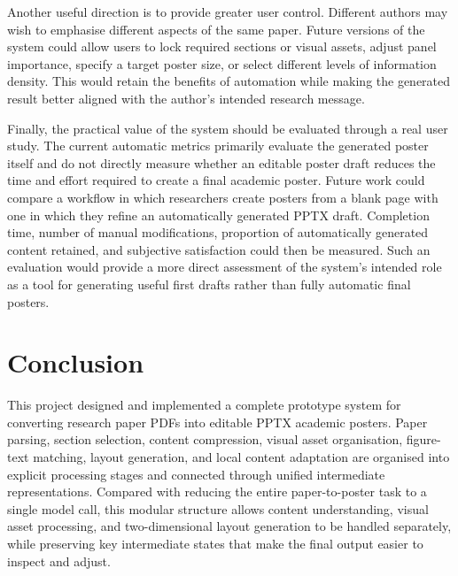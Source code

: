 \documentclass[12pt,oneside]{report}
\begin{document}
\vspace{1em}

Another useful direction is to provide greater user control. Different authors may wish to emphasise different aspects of the same paper. Future versions of the system could allow users to lock required sections or visual assets, adjust panel importance, specify a target poster size, or select different levels of information density. This would retain the benefits of automation while making the generated result better aligned with the author's intended research message.

\vspace{1em}

Finally, the practical value of the system should be evaluated through a real user study. The current automatic metrics primarily evaluate the generated poster itself and do not directly measure whether an editable poster draft reduces the time and effort required to create a final academic poster. Future work could compare a workflow in which researchers create posters from a blank page with one in which they refine an automatically generated PPTX draft. Completion time, number of manual modifications, proportion of automatically generated content retained, and subjective satisfaction could then be measured. Such an evaluation would provide a more direct assessment of the system's intended role as a tool for generating useful first drafts rather than fully automatic final posters.


\chapter{Conclusion}

This project designed and implemented a complete prototype system for converting research paper PDFs into editable PPTX academic posters. Paper parsing, section selection, content compression, visual asset organisation, figure-text matching, layout generation, and local content adaptation are organised into explicit processing stages and connected through unified intermediate representations. Compared with reducing the entire paper-to-poster task to a single model call, this modular structure allows content understanding, visual asset processing, and two-dimensional layout generation to be handled separately, while preserving key intermediate states that make the final output easier to inspect and adjust.
\end{document}
